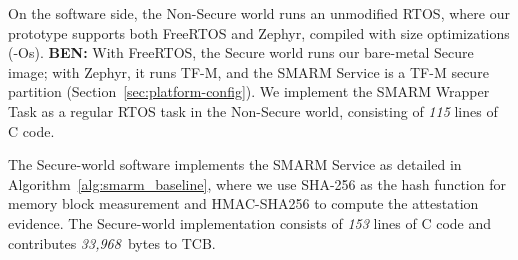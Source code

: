 \documentclass{ieeeaccess}
\DeclareRobustCommand{\ben}[1]{{\color{BENcolor}\textbf{BEN:} #1}}
\begin{document}
On the software side, the Non-Secure world runs an unmodified RTOS, where our prototype supports both FreeRTOS and Zephyr, compiled with size optimizations (-Os).
\ben{With FreeRTOS, the Secure world runs our bare-metal Secure image; with Zephyr, it runs TF-M, and the SMARM Service is a TF-M secure partition (Section~\ref{sec:platform-config}).}
We implement the SMARM Wrapper Task as a regular RTOS task in the Non-Secure world, consisting of \textit{115} lines of C code.
%

The Secure-world software implements the SMARM Service as detailed 
in Algorithm~\ref{alg:smarm_baseline}, where we use SHA-256 as the 
hash function for memory block measurement and HMAC-SHA256 to compute 
the attestation evidence. The Secure-world implementation consists of 
\textit{153} lines of C code and contributes \textit{33{,}968}~bytes 
to TCB.
\end{document}
